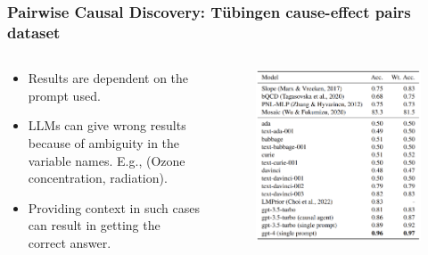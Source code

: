 \documentclass{beamer}
\begin{document}
\begin{frame}
	\frametitle{Pairwise Causal Discovery: T\"{u}bingen cause-effect pairs dataset}
	\begin{columns}
		\begin{column}{0.5 \textwidth}
			\begin{itemize}
				\item Results are dependent on the prompt used.
				\item LLMs can give wrong results because of ambiguity in the variable names. E.g., (Ozone concentration, radiation).
				\item Providing context in such cases can result in getting the correct answer.
			\end{itemize}
		\end{column}
		\begin{column}{0.5 \textwidth}
			\begin{figure}
				\includegraphics[scale=0.2]{imgs/table2.png}
			\end{figure}
		\end{column}
	\end{columns}
\end{frame}
\end{document}
